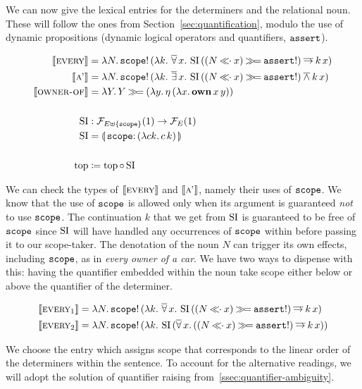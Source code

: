 We can now give the lexical entries for the determiners and the relational
noun. These will follow the ones from Section~\ref{sec:quantification},
modulo the use of dynamic propositions (dynamic logical operators and
quantifiers, $\mathtt{assert}$).

\begin{align*}
  \lex{every}{\lam{N}{\ap{\op{scope}!}{(\lam{k}{\dforall x.\,\ap{\SI}{((N \apl x) \hsbind \op{assert}!)} \dimp \ap{k}{x}})}}} \\
  \lex{a'}{\lam{N}{\ap{\op{scope}!}{(\lam{k}{\dexists x.\,\ap{\SI}{((N \apl x) \hsbind \op{assert}!)} \dand \ap{k}{x}})}}} \\
  \lex{owner-of}{\lam{Y}{Y \hsbind (\lam{y}{\etaE{(\lam{x}{\app{\obj{own}}{x}{y}})}})}} \\
  \\
  \SI &: \FF_{E \uplus \{\op{scope}\}}(1) \to \FF_E(1) \\
  \SI &= \banana{\onto{\op{scope}}{(\lam{c k}{\ap{c}{k}})}} \\
  \\
  \TOP &\coloneqq \TOP \circ \SI
\end{align*}

We can check the types of $\llbracket \textsc{every} \rrbracket$ and $\llbracket \textsc{a'} \rrbracket$, namely
their uses of $\mathtt{scope}$. We know that the use of $\mathtt{scope}$ is allowed
only when its argument is guaranteed \emph{not} to use $\mathtt{scope}$. The
continuation $k$ that we get from $\operatorname{SI}$ is guaranteed to be free of
$\mathtt{scope}$ since $\operatorname{SI}$ will have handled any occurrences of $\mathtt{scope}$
within before passing it to our scope-taker. The denotation of the noun $N$
can trigger its own effects, including $\mathtt{scope}$, as in \emph{every
  owner of a car}. We have two ways to dispense with this: having the
quantifier embedded within the noun take scope either below or above the
quantifier of the determiner.

\begin{align*}
  \llbracket \textsc{every}_1 \rrbracket &= \lambda N.\, \mathtt{scope}!\,(\lambda k.\, \mathop{\overline{\forall}} x.\,\operatorname{SI}\,((N \mathbin{\ll\!\!\cdot} x) \mathbin{\gg\!=} \mathtt{assert}!) \mathbin{\overline{\to}} k\,x) \\
  \llbracket \textsc{every}_2 \rrbracket &= \lambda N.\, \mathtt{scope}!\,(\lambda k.\, \operatorname{SI}\,(\mathop{\overline{\forall}} x.\,((N \mathbin{\ll\!\!\cdot} x) \mathbin{\gg\!=} \mathtt{assert}!) \mathbin{\overline{\to}} k\,x))
\end{align*}

We choose the entry which assigns scope that corresponds to the linear
order of the determiners within the sentence. To account for the
alternative readings, we will adopt the solution of quantifier raising
from~\ref{ssec:quantifier-ambiguity}.

